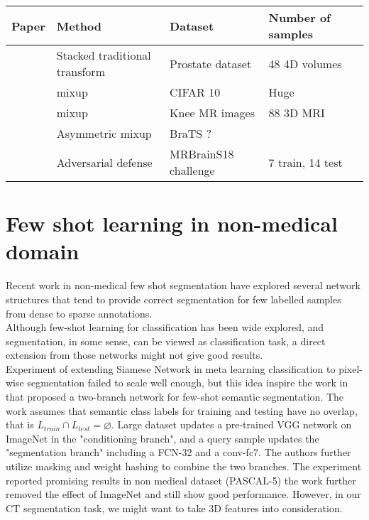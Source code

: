 \begin{tabular}{lllll}
\hline
Paper                                             & Method                        & Dataset              & Number of samples &  \\
\hline
\cite{zhang_when_2019}       & Stacked traditional transform & Prostate dataset     & 48 4D volumes     &  \\
\cite{zhang_mixup_2018}       & mixup                         & CIFAR 10             & Huge              &  \\
\cite{panfilov_improving_2019} & mixup                         & Knee MR images       & 88 3D MRI         &  \\
\cite{li_overfitting_2019}   & Asymmetric mixup              & BraTS ?              &                   &  \\
\cite{suk_brain_2019}                    & Adversarial defense           & MRBrainS18 challenge & 7 train, 14 test  &  \\
\hline
\end{tabular}




%
\section{Few shot learning in non-medical domain}
Recent work in non-medical few shot segmentation have explored several network structures that tend to provide correct segmentation for few labelled samples from dense to sparse annotations.\\

 Although few-shot learning for classification has been wide explored, and segmentation, in some sense, can be viewed as classification task,
 a direct extension from those networks might not give good results.\\
 
  Experiment of extending Siamese Network in meta learning classification to pixel-wise segmentation failed to scale well enough, but this idea inspire the work in \cite{shaban_one-shot_2017} that proposed a two-branch network for few-shot semantic segmentation. The work assumes that semantic class labels for training and testing have no overlap, that is $L_{train} \cap L_{test}= \varnothing$. Large dataset updates a pre-trained VGG network on ImageNet in the "conditioning branch", and a query sample updates the "segmentation branch" including a FCN-32 and a conv-fc7. The authors further utilize masking and weight hashing to combine the two branches. The experiment reported promising results in non medical dataset (PASCAL-5) the work further removed the effect of ImageNet and still show good performance. However, in our CT segmentation task, we might want to take 3D features into consideration.\\

